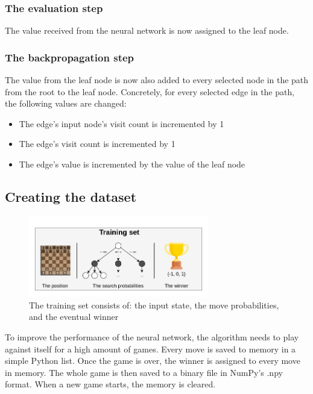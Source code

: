 \documentclass{article}
\begin{document}
\subsubsection{The evaluation step}

The value received from the neural network is now assigned to the leaf node.

\subsubsection{The backpropagation step}

The value from the leaf node is now also added to every selected node in the path from the root to the leaf node.
Concretely, for every selected edge in the path, the following values are changed:

\begin{itemize}
    \item The edge's input node's visit count is incremented by 1
    \item The edge's visit count is incremented by 1
    \item The edge's value is incremented by the value of the leaf node
\end{itemize}


\subsection{Creating the dataset}


\begin{figure}[H]
    \centering
    \includegraphics[width=0.7\textwidth]{img/trainingset.png}
    \caption{The training set consists of: the input state, the move probabilities, and the eventual winner}
\end{figure}

To improve the performance of the neural network, the algorithm needs to play against itself for a high amount of games.
Every move is saved to memory in a simple Python list. Once the game is over, the winner is assigned to every move in memory.
The whole game is then saved to a binary file in NumPy's .npy format. 
When a new game starts, the memory is cleared.
\end{document}

